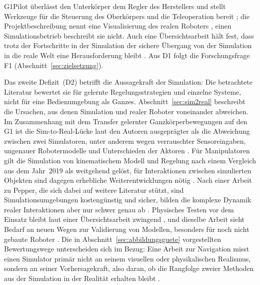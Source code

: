G1Pilot überlässt den Unterkörper dem Regler des Herstellers und stellt Werkzeuge für die Steuerung des Oberkörpers und die Teleoperation bereit \cite{HucebotG1Pilot}; die Projektbeschreibung nennt eine Visualisierung des realen Roboters \cite{HucebotG1Pilot}, einen Simulationsbetrieb beschreibt sie nicht.
Auch eine Übersichtsarbeit hält fest, dass trotz der Fortschritte in der Simulation der sichere Übergang von der Simulation in die reale Welt eine Herausforderung bleibt \cite{Tong2024}.
Aus D1 folgt die Forschungsfrage F1 (Abschnitt~\ref{sec:zielsetzung}).

Das zweite Defizit~(D2) betrifft die Aussagekraft der Simulation: Die betrachtete Literatur bewertet sie für gelernte Regelungsstrategien und einzelne Systeme, nicht für eine Bedienumgebung als Ganzes.
Abschnitt~\ref{sec:sim2real} beschreibt die Ursachen, aus denen Simulation und realer Roboter voneinander abweichen.
Im Zusammenhang mit dem Transfer gelernter Ganzkörperbewegungen auf den G1 ist die Sim-to-Real-Lücke laut den Autoren ausgeprägter als die Abweichung zwischen zwei Simulatoren, unter anderem wegen verrauschter Sensoreingaben, ungenauer Robotermodelle und Unterschieden der Aktoren \cite{He2025}.
Für Manipulatoren gilt die Simulation von kinematischem Modell und Regelung nach einem Vergleich aus dem Jahr~2019 als weitgehend gelöst, für Interaktionen zwischen simulierten Objekten sind dagegen erhebliche Weiterentwicklungen nötig \cite{Collins2019}.
Nach einer Arbeit zu Pepper, die sich dabei auf weitere Literatur stützt, sind Simulationsumgebungen kostengünstig und sicher, bilden die komplexe Dynamik realer Interaktionen aber nur schwer genau ab \cite{Sekkat2024}.
Physisches Testen vor dem Einsatz bleibt laut einer Übersichtsarbeit zwingend \cite{Choi2021}, und dieselbe Arbeit sieht Bedarf an neuen Wegen zur Validierung von Modellen, besonders für noch nicht gebaute Roboter \cite{Choi2021}.
Die in Abschnitt~\ref{sec:abbildungsguete} vorgestellten Bewertungswege unterscheiden sich im Bezug: Eine Arbeit zur Navigation misst einen Simulator primär nicht an seinem visuellen oder physikalischen Realismus, sondern an seiner Vorhersagekraft, also daran, ob die Rangfolge zweier Methoden aus der Simulation in der Realität erhalten bleibt \cite{Kadian2020}.
